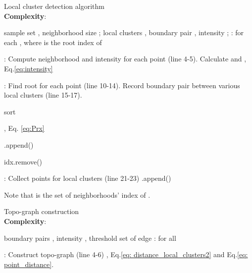 \documentclass[letterpaper]{article} \usepackage{aaai22}  \usepackage{times}  \usepackage{helvet}  \usepackage{courier}  \usepackage[hyphens]{url}  \usepackage{graphicx} \urlstyle{rm} \def\UrlFont{\rm}  \usepackage{natbib}  \usepackage{caption} \DeclareCaptionStyle{ruled}{labelfont=normalfont,labelsep=colon,strut=off} \frenchspacing  \setlength{\pdfpagewidth}{8.5in}  \setlength{\pdfpageheight}{11in}  \usepackage{subfigure}
\begin{document}
\begin{algorithm}
    \caption{Local cluster detection algorithm \\
            \textbf{Complexity}: }
    \label{algorithm: local_cluster_detecting}
    \begin{algorithmic}[1]
        \Require sample set , neighborhood size ; 
        \Ensure local clusters , boundary pair , intensity ;
        :  for each , where  is the root index of 
        
        \State
        : Compute neighborhood and intensity for each point  (line 4-5).
        \For{ }
            \State Calculate  and , Eq.\ref{eq:intensity} \Comment{{\color{gray}}}
        \EndFor
        
        \State
       : Find root for each point (line 10-14). Record boundary pair between various local clusters (line 15-17).
       
        \State  sort \Comment{{\color{gray}}}
        
        \While{}  \Comment{ {\color{gray}} }
            \State 
            \State  \Comment{{\color{gray} }}

            \State , Eq. \ref{eq:Prx} \Comment{{\color{gray}}}
            
            \If {} 
                \State   {}
                \For{} 
                        \State .append() 
                    \EndIf
                \EndFor
            \EndIf
            
            \State idx.remove() 
        \EndWhile
        
        \State
        : Collect points for local clusters (line 21-23)
        \State  {}
        \For{ }  \Comment{{\color{gray}}}
            \State .append() 
        \EndFor
    \end{algorithmic}
    
    Note that  is the set of neighborhoods' index of .
\end{algorithm}


\begin{algorithm}
    \caption{Topo-graph construction \\
            \textbf{Complexity}: }
    \label{algorithm: topo-graph construction and pruning}
    \begin{algorithmic}[1]
    \Require boundary pairs , intensity , threshold 
    \Ensure set of edge 
        :  for all 
        
        \State
        : Construct topo-graph (line 4-6)
        \For{} \Comment{{\color{gray}}}
            \State , Eq.\ref{eq: distance_local_clusters2} and Eq.\ref{eq: point_distance}.
            \State 
        \EndFor
        
\end{algorithmic}
\end{algorithm}
\end{document}
